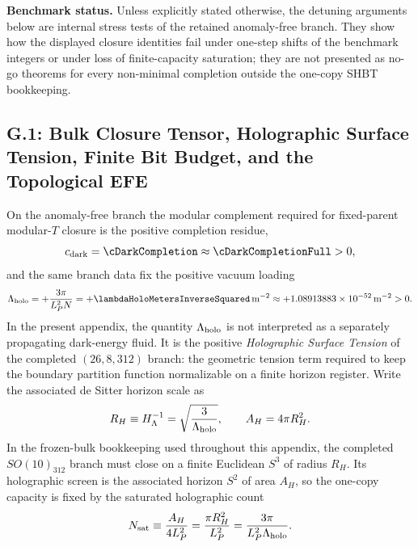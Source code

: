 \documentclass[11pt]{article}
\begin{document}
\noindent\textbf{Benchmark status.} Unless explicitly stated otherwise, the detuning arguments below are internal stress tests of the retained anomaly-free branch. They show how the displayed closure identities fail under one-step shifts of the benchmark integers or under loss of finite-capacity saturation; they are not presented as no-go theorems for every non-minimal completion outside the one-copy SHBT bookkeeping.

\subsection*{G.1: Bulk Closure Tensor, Holographic Surface Tension, Finite Bit Budget, and the Topological EFE}

On the anomaly-free branch the modular complement required for fixed-parent modular-$T$ closure is the positive completion residue,
\begin{equation}
\label{eq:gravity-closure-residue}
 c_{\rm dark}=\cDarkCompletion\approx \cDarkCompletionFull>0,
\end{equation}
and the same branch data fix the positive vacuum loading
\begin{equation}
\label{eq:gravity-lambda-positive}
 \Lambda_{\rm holo}=+\frac{3\pi}{L_P^2N}=+\lambdaHoloMetersInverseSquared\,\mathrm{m}^{-2}\approx +1.08913883\times10^{-52}\,\mathrm{m}^{-2}>0.
\end{equation}
In the present appendix, the quantity $\Lambda_{\rm holo}$ is not interpreted
as a separately propagating dark-energy fluid. It is the positive
\emph{Holographic Surface Tension} of the completed $(26,8,312)$ branch: the
geometric tension term required to keep the boundary partition function
normalizable on a finite horizon register.
Write the associated de Sitter horizon scale as
\begin{equation}
\label{eq:gravity-horizon-radius}
 R_H
 \equiv
 H_{\Lambda}^{-1}
 =
 \sqrt{\frac{3}{\Lambda_{\rm holo}}},
 \qquad
 A_H=4\pi R_H^2.
\end{equation}
In the frozen-bulk bookkeeping used throughout this appendix, the completed
$SO(10)_{312}$ branch must close on a finite Euclidean $S^3$ of radius $R_H$.
Its holographic screen is the associated horizon $S^2$ of area $A_H$, so the
one-copy capacity is fixed by the saturated holographic count
\begin{equation}
\label{eq:gravity-bit-budget-derived}
 N_{\rm sat}
 \equiv
 \frac{A_H}{4L_P^2}
 =
 \frac{\pi R_H^2}{L_P^2}
 =
 \frac{3\pi}{L_P^2\Lambda_{\rm holo}}.
\end{equation}
\end{document}
